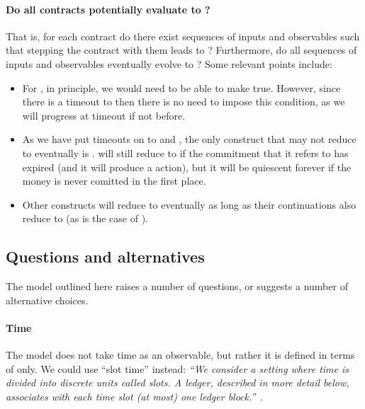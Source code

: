 \documentclass[runningheads]{llncs}
\begin{document}
{\paragraph{Do all contracts potentially evaluate to ?}

That is, for each contract do there exist sequences of inputs and observables such that stepping the contract with them 
leads to ? Furthermore, do all sequences of inputs and observables eventually evolve to 
? Some relevant points include:
\begin{itemize}
\item For , in principle, we would need to be able to make  
true. However, since there is  a timeout to  then there is no need to impose this condition, as we 
will progress at timeout if not before.
\item As we have put timeouts on to  and , the only construct that may not 
reduce to  eventually is .  will still reduce to 
 if the commitment that it refers to has expired (and it will produce a 
 action), but it will be quiescent forever if the money is never comitted in the first 
place.
\item Other constructs will reduce to  eventually as long as their continuations also reduce to 
 (as is the case of ).
\end{itemize}

\subsection{Questions and alternatives}

The model outlined here raises a number of questions, or suggests a number of alternative choices.

\paragraph{Time}

The model does not take time as an observable, but rather it is defined in terms of  only. 
We could  use ``slot time'' instead: \emph{``We consider a setting where time is divided into discrete units called 
slots. A ledger, described in more detail below, associates with each time slot (at most) one ledger 
block.''}~\cite{Ouroboros}.

}
\end{document}
